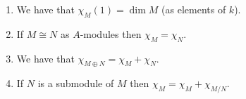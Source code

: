 \begin{lemma}
  \leavevmode
  \label{lemma: properties of general characters}
  \begin{enumerate}
    \item
      We have that $\chi_M(1) = \dim M$ (as elements of $k$).
    \item
      If $M \cong N$ as $A$-modules then $\chi_M = \chi_N$.
    \item
      \label{enumerate: character of direct sum}
      We have that $\chi_{M \oplus N} = \chi_M + \chi_N$.
    \item
      \label{enumerate: character of quotient}
      If $N$ is a submodule of $M$ then $\chi_M = \chi_M + \chi_{M/N}$.
  \end{enumerate}
\end{lemma}
